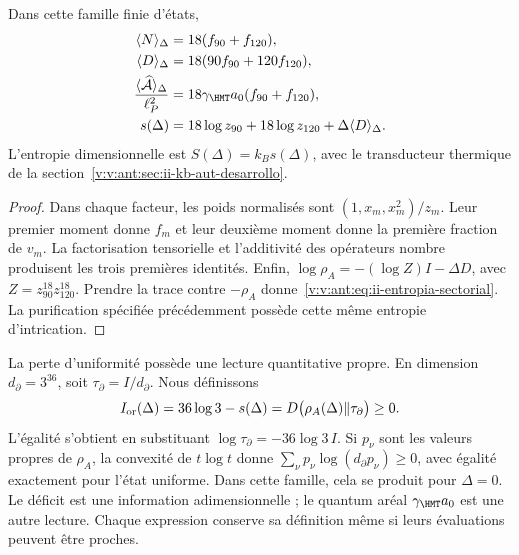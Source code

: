\begin{proposition}
Dans cette famille finie d'états,
\begin{align}
 \langle N\rangle_\Delta&=18(f_{90}+f_{120}),\\
 \langle D\rangle_\Delta&=18(90f_{90}+120f_{120}),\\
 \frac{\langle\widehat{\mathcal A}\rangle_\Delta}{\ell_P^2}
 &=18\gamma_{\HMT}a_0(f_{90}+f_{120}),
 \label{v:v:ant:eq:ii-area-media}\\
 s(\Delta)&=18\log z_{90}+18\log z_{120}
                  +\Delta\langle D\rangle_\Delta.
 \label{v:v:ant:eq:ii-entropia-sectorial}
\end{align}
L'entropie dimensionnelle est $S(\Delta)=k_Bs(\Delta)$, avec le
transducteur thermique de la section~\ref{v:v:ant:sec:ii-kb-aut-desarrollo}.
\end{proposition}
\begin{proof}
Dans chaque facteur, les poids normalisés sont
$(1,x_m,x_m^2)/z_m$. Leur premier moment donne $f_m$ et leur deuxième
moment donne la première fraction de $v_m$. La factorisation tensorielle
et l'additivité des opérateurs nombre produisent les trois premières
identités. Enfin,
$\log\rho_A=-(\log Z)I-\Delta D$, avec
$Z=z_{90}^{18}z_{120}^{18}$. Prendre la trace contre $-\rho_A$
donne~\eqref{v:v:ant:eq:ii-entropia-sectorial}. La purification spécifiée
précédemment possède cette même entropie d'intrication.
\end{proof}

La perte d'uniformité possède une lecture quantitative propre.
En dimension \(d_\partial=3^{36}\), soit
\(\tau_\partial=I/d_\partial\). Nous définissons
\begin{equation}
 I_{\rm or}(\Delta)=36\log3-s(\Delta)
 =D\bigl(\rho_A(\Delta)\Vert\tau_\partial\bigr)\ge0.
 \label{v:v:ant:eq:ii-area-deficit-informacional}
\end{equation}
L'égalité s'obtient en substituant
\(\log\tau_\partial=-36\log3\,I\). Si \(p_\nu\) sont les
valeurs propres de \(\rho_A\), la convexité de \(t\log t\) donne
\(\sum_\nu p_\nu\log(d_\partial p_\nu)\ge0\), avec égalité
exactement pour l'état uniforme. Dans cette famille, cela se produit pour
\(\Delta=0\). Le déficit est une information adimensionnelle ; le quantum
aréal \(\gamma_{\HMT}a_0\) est une autre lecture. Chaque expression conserve
sa définition même si leurs évaluations peuvent être proches.

